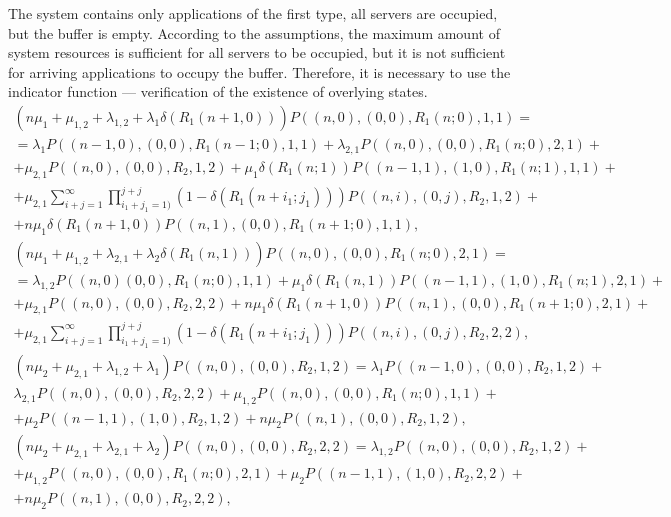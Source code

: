 {The system contains only applications of the first type, all servers
are occupied, but the buffer is empty. According to the assumptions,
the maximum amount of system resources is sufficient for all servers
to be occupied, but it is not sufficient for arriving applications to
occupy the buffer. Therefore, it is necessary to use the indicator
function --- verification of the existence of overlying states.
\begin{multline}
  \left(n\mu_1+\mu_{1,2}+\lambda_{1,2}+\lambda_1 \delta\left(R_1
      (n+1,0)\right)\right) P\left((n,0),(0,0),R_1 (n;0),1,1\right) =
  \\ = \lambda_1 P\left((n-1,0),(0,0),R_1
    (n-1;0),1,1\right)+\lambda_{2,1} P\left((n,0),(0,0),R_1
    (n;0),2,1\right)+ \\ + \mu_{2,1}
  P\left((n,0),(0,0),R_2,1,2\right)+\mu_1 \delta\left(R_1 (n;1)\right)
  P\left((n-1,1),(1,0),R_1 (n;1),1,1\right)+\\ + \mu_{2,1}
  \sum\limits_{i+j=1}^{\infty}\prod\limits_{i_1+j_1=1)}^{j+j}\left(1-\delta\left(R_1
      (n+i_1;j_1) \right)\right) P\left((n,i),(0,j),R_2,1,2\right)+ \\
  + n\mu_1 \delta\left(R_1 (n+1,0)\right) P\left((n,1),(0,0),R_1
    (n+1;0),1,1\right),
\label{eq:3.1}
\end{multline}
\begin{multline}
  \left(n\mu_1+\mu_{1,2}+\lambda_{2,1}+\lambda_2 \delta\left(R_1
      (n,1)\right)\right) P\left((n,0),(0,0),R_1 (n;0),2,1\right) = \\
  = \lambda_{1,2} P\left((n,0)(0,0),R_1 (n;0),1,1\right)+ \mu_1
  \delta\left(R_1 (n,1)\right) P\left((n-1,1),(1,0),R_1
    (n;1),2,1\right)+\\ + \mu_{2,1} P\left((n,0),(0,0),R_2,2,2\right)+
  n\mu_1 \delta\left(R_1 (n+1,0)\right) P\left((n,1),(0,0), R_1
    (n+1;0),2,1\right)+ \\ + \mu_{2,1}
  \sum\limits_{i+j=1}^{\infty}\prod\limits_{i_1+j_1=1)}^{j+j}\left(1-\delta\left(R_1
      (n+i_1;j_1) \right)\right) P\left((n,i),(0,j),R_2,2,2\right),
\label{eq:3.2}
\end{multline}
\begin{multline}
  \left(n\mu_2+\mu_{2,1}+\lambda_{1,2}+\lambda_1 \right)
  P\left((n,0),(0,0),R_2,1,2\right) =
  \lambda_1 P\left((n-1,0),(0,0),R_2,1,2\right)+\\
  \lambda_{2,1} P\left((n,0),(0,0),R_2,2,2\right)+ \mu_{1,2}
  P\left((n,0),(0,0), R_1(n;0),1,1\right)+\\ + \mu_2
  P\left((n-1,1),(1,0),R_2,1,2\right)+ n\mu_2 P\left((n,1),(0,0),
    R_2,1,2\right),
\label{eq:3.3}
\end{multline}
\begin{multline}
  \left(n\mu_2+\mu_{2,1}+\lambda_{2,1}+\lambda_2\right)
  P\left((n,0),(0,0),R_2,2,2\right) = \lambda_{1,2}
  P\left((n,0),(0,0),R_2,1,2\right)+ \\ + \mu_{1,2}
  P\left((n,0),(0,0),R_1(n;0),2,1\right)+\mu_2
  P\left((n-1,1),(1,0),R_2,2,2\right)+\\ + n\mu_2 P\left((n,1),(0,0),
    R_2,2,2\right),
\label{eq:3.4}
\end{multline}

}
